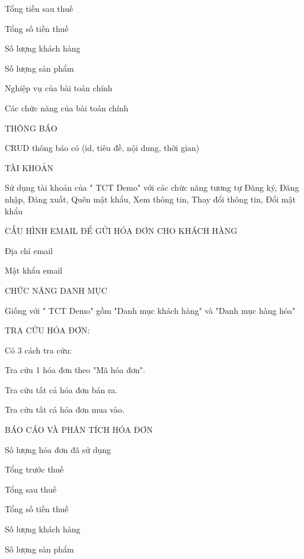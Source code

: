 Tổng tiền sau thuế

Tổng số tiền thuế

Số lượng khách hàng

Số lượng sản phẩm


Nghiệp vụ của bài toán chính

Các chức năng của bài toán chính

THÔNG BÁO

CRUD thông báo có (id, tiêu đề, nội dung, thời gian)

TÀI KHOẢN

Sử dụng tài khoản của " TCT Demo" với các chức năng tương tự Đăng ký, Đăng nhập, Đăng xuất, Quên mật khẩu, Xem thông tin, Thay đổi thông tin, Đổi mật khẩu

CẤU HÌNH EMAIL ĐỂ GỬI HÓA ĐƠN CHO KHÁCH HÀNG

Địa chỉ email

Mật khẩu email

CHỨC NĂNG DANH MỤC

Giống với " TCT Demo" gồm "Danh mục khách hàng" và "Danh mục hàng hóa"

TRA CỨU HÓA ĐƠN:

Có 3 cách tra cứu:

Tra cứu 1 hóa đơn theo "Mã hóa đơn".

Tra cứu tất cả hóa đơn bán ra.

Tra cứu tất cả hóa đơn mua vào.

BÁO CÁO VÀ PHÂN TÍCH HÓA ĐƠN

Số lượng hóa đơn đã sử dụng

Tổng trước thuế

Tổng sau thuế

Tổng số tiền thuế

Số lượng khách hàng

Số lượng sản phẩm






